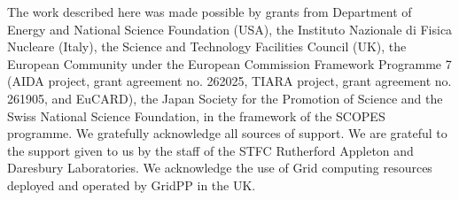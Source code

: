 \documentclass[11pt]{article}
\begin{document}
\acknowledgments

The work described here was made possible by grants from Department of Energy and National Science Foundation
(USA), the Instituto Nazionale di Fisica Nucleare (Italy), the Science and Technology Facilities Council
(UK), the European Community under the European Commission Framework Programme 7 (AIDA project,
grant agreement no. 262025, TIARA project, grant agreement no. 261905, and EuCARD), the Japan Society
for the Promotion of Science and the Swiss National Science Foundation, in the framework of the SCOPES
programme. We gratefully acknowledge all sources of support. We are grateful to the support given to us
by the staff of the STFC Rutherford Appleton and Daresbury Laboratories. We acknowledge the use of Grid
computing resources deployed and operated by GridPP \cite{GridPP} in the UK.


                                                                           





%

% 
\end{document}
